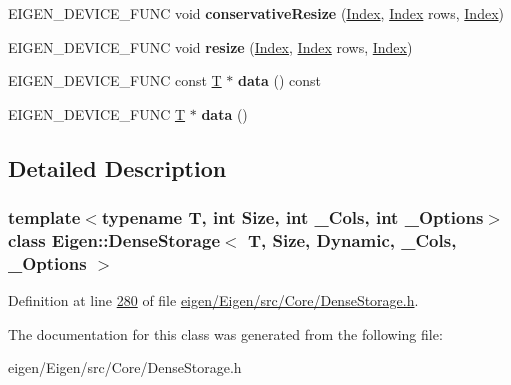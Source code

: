 \begin{DoxyCompactItemize}
E\+I\+G\+E\+N\+\_\+\+D\+E\+V\+I\+C\+E\+\_\+\+F\+U\+NC void {\bfseries conservative\+Resize} (\hyperlink{namespace_eigen_a62e77e0933482dafde8fe197d9a2cfde}{Index}, \hyperlink{namespace_eigen_a62e77e0933482dafde8fe197d9a2cfde}{Index} rows, \hyperlink{namespace_eigen_a62e77e0933482dafde8fe197d9a2cfde}{Index})
\item 
\mbox{\label{class_eigen_1_1_dense_storage_3_01_t_00_01_size_00_01_dynamic_00_01___cols_00_01___options_01_4_a0b51f860951682cc2a7a9b79ffc6777a}} 
E\+I\+G\+E\+N\+\_\+\+D\+E\+V\+I\+C\+E\+\_\+\+F\+U\+NC void {\bfseries resize} (\hyperlink{namespace_eigen_a62e77e0933482dafde8fe197d9a2cfde}{Index}, \hyperlink{namespace_eigen_a62e77e0933482dafde8fe197d9a2cfde}{Index} rows, \hyperlink{namespace_eigen_a62e77e0933482dafde8fe197d9a2cfde}{Index})
\item 
\mbox{\label{class_eigen_1_1_dense_storage_3_01_t_00_01_size_00_01_dynamic_00_01___cols_00_01___options_01_4_ab6606759dd7f16399e0922315509caee}} 
E\+I\+G\+E\+N\+\_\+\+D\+E\+V\+I\+C\+E\+\_\+\+F\+U\+NC const \hyperlink{group___sparse_core___module}{T} $\ast$ {\bfseries data} () const
\item 
\mbox{\label{class_eigen_1_1_dense_storage_3_01_t_00_01_size_00_01_dynamic_00_01___cols_00_01___options_01_4_afb648bf11a37861f3906c330e83c5711}} 
E\+I\+G\+E\+N\+\_\+\+D\+E\+V\+I\+C\+E\+\_\+\+F\+U\+NC \hyperlink{group___sparse_core___module}{T} $\ast$ {\bfseries data} ()
\end{DoxyCompactItemize}


\subsection{Detailed Description}
\subsubsection*{template$<$typename T, int Size, int \+\_\+\+Cols, int \+\_\+\+Options$>$\newline
class Eigen\+::\+Dense\+Storage$<$ T, Size, Dynamic, \+\_\+\+Cols, \+\_\+\+Options $>$}



Definition at line \hyperlink{eigen_2_eigen_2src_2_core_2_dense_storage_8h_source_l00280}{280} of file \hyperlink{eigen_2_eigen_2src_2_core_2_dense_storage_8h_source}{eigen/\+Eigen/src/\+Core/\+Dense\+Storage.\+h}.



The documentation for this class was generated from the following file\+:\begin{DoxyCompactItemize}
\item 
eigen/\+Eigen/src/\+Core/\+Dense\+Storage.\+h\end{DoxyCompactItemize}
